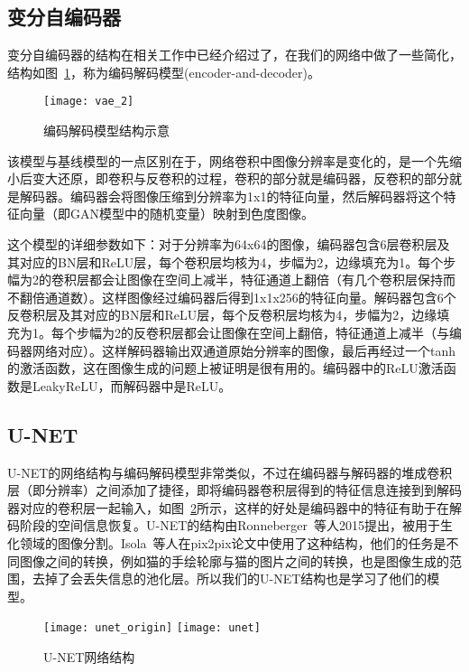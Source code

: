\subsection{变分自编码器}
\label{sec:3-vae}

  变分自编码器的结构在相关工作中已经介绍过了，在我们的网络中做了一些简化，结构如图~\ref{fig:vae-2}，称为编码解码模型(encoder-and-decoder)。

  \begin{figure}[H]
    \centering
    \texttt{[image: vae\_2]}
    \caption{编码解码模型结构示意}
    \label{fig:vae-2}
  \end{figure}

  该模型与基线模型的一点区别在于，网络卷积中图像分辨率是变化的，是一个先缩小后变大还原，即卷积与反卷积的过程，卷积的部分就是编码器，反卷积的部分就是解码器。编码器会将图像压缩到分辨率为1x1的特征向量，然后解码器将这个特征向量（即GAN模型中的随机变量）映射到色度图像。

  这个模型的详细参数如下：对于分辨率为64x64的图像，编码器包含6层卷积层及其对应的BN层和ReLU层，每个卷积层均核为4，步幅为2，边缘填充为1。每个步幅为2的卷积层都会让图像在空间上减半，特征通道上翻倍（有几个卷积层保持而不翻倍通道数）。这样图像经过编码器后得到1x1x256的特征向量。解码器包含6个反卷积层及其对应的BN层和ReLU层，每个反卷积层均核为4，步幅为2，边缘填充为1。每个步幅为2的反卷积层都会让图像在空间上翻倍，特征通道上减半（与编码器网络对应）。这样解码器输出双通道原始分辨率的图像，最后再经过一个tanh的激活函数，这在图像生成的问题上被证明是很有用的。编码器中的ReLU激活函数是LeakyReLU，而解码器中是ReLU。

\subsection{U-NET}
\label{sec:3-unet}

  U-NET的网络结构与编码解码模型非常类似，不过在编码器与解码器的堆成卷积层（即分辨率）之间添加了捷径，即将编码器卷积层得到的特征信息连接到到解码器对应的卷积层一起输入，如图~\ref{fig:unet}所示，这样的好处是编码器中的特征有助于在解码阶段的空间信息恢复。U-NET的结构由Ronneberger~\cite{DBLP:journals/corr/RonnebergerFB15}等人2015提出，被用于生化领域的图像分割。Isola~\cite{DBLP:journals/corr/IsolaZZE16}等人在pix2pix论文中使用了这种结构，他们的任务是不同图像之间的转换，例如猫的手绘轮廓与猫的图片之间的转换，也是图像生成的范围，去掉了会丢失信息的池化层。所以我们的U-NET结构也是学习了他们的模型。

  \begin{figure}[H]
    \centering
      {\texttt{[image: unet\_origin]}}
    \hspace{4em}
        {\texttt{[image: unet]}}
    \caption{U-NET网络结构}
    \label{fig:unet}
  \end{figure}

